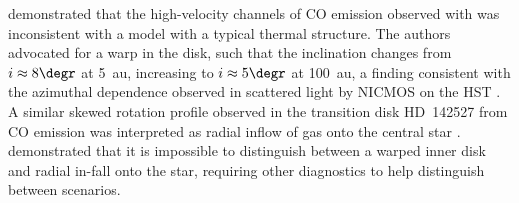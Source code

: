 \citet{2015ApJ...807....2C} demonstrated that the high-velocity channels of CO 
emission observed with \citep{Cleeves_ea_2015a} was inconsistent with a model 
with a typical thermal structure. The authors advocated for a warp in the disk, 
such that the inclination changes from $i \approx 8\degr$ at 5~au, increasing 
to $i \approx 5\degr$ at 100~au, a finding consistent with the azimuthal 
dependence observed in scattered light by NICMOS on the \gls{HST} 
\citep{2015ApJ...799..204C}. A similar skewed rotation profile observed in the
 transition disk HD~142527 from CO emission was interpreted as radial inflow 
 of gas onto the central star \citep{1994A&A...291..943O}. 
 \citet{2015ApJ...799..204C} demonstrated that it is impossible to distinguish 
 between a warped inner disk and radial in-fall onto the star, requiring other 
 diagnostics to help distinguish between scenarios.
